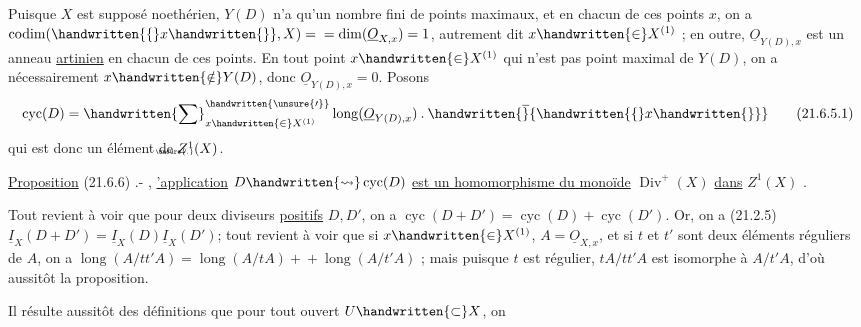 Puisque $X$ est supposé noethérien, $Y(D)$ n'a qu'un nombre fini de points maximaux, et en chacun de ces points $x$, on a $\operatorname{codim}(\handwritten{\{}x\handwritten{\}},X)={}\allowbreak{}=\operatorname{dim}(\underline O_{X,x})=1$, autrement dit $x\handwritten{\in}X^{(1)}$ ;
\normalmarginpar
{} en outre, $\underline O_{Y(D),x}$ est un anneau \uline{artinien} en chacun de ces points. En tout point $x\handwritten{\in}X^{(1)}$ qui n'est pas point maximal de $Y(D)$, on a nécessairement $x\handwritten{\notin}Y(D)$, donc $\underline O_{Y(D),x}=0$. Posons
\[
  \operatorname{cyc}(D)=\handwritten{\sum}^{\handwritten{\unsure{\prime}}}_{x\handwritten{\in}X^{(1)}}
  \operatorname{long}(\underline O_{Y(D),x})\mathbin{.}\handwritten{\overline}{\handwritten{\{}x\handwritten{\}}}
  \tag*{(21.6.5.1)}
\]
qui est donc un élément de $Z^{1}\llap{\raisebox{-.12ex}[0pt][0pt]{\tiny\unsure{.}}}(X)$.

\uline{Proposition} (21.6.6) .- , \uline{'application} $D\handwritten{\leadsto}\operatorname{cyc}(D)$\deleted{\unsure{;}} \uline{est un homomorphisme du monoïde} $\operatorname{Div}^{+}(X)$ \uline{dans} $Z^{1}(X)$ .

Tout revient à voir que pour deux diviseurs \uline{positifs} $D,D'$, on a $\operatorname{cyc}(D+D')=\operatorname{cyc}(D)+\operatorname{cyc}(D')$. Or, on a (21.2.5) $\underline I_{X}(D+D')=\underline I_{X}(D)\underline I_{X}(D')$; tout revient à voir que si $x\handwritten{\in}X^{(1)}$,  $A=\underline O_{X,x}$, et si $t$ et $t'$ sont deux éléments réguliers de $A$, on a $\operatorname{long}(A/tt'A)=\operatorname{long}(A/tA)+{}\allowbreak{}+\operatorname{long}(A/t'A)$ ; mais puisque  $t$ est régulier, $tA/tt'A$ est isomorphe à $A/t'A$, d'où  aussitôt la proposition.

Il résulte aussitôt des définitions que pour tout ouvert $U\handwritten{\subset}X$, on
